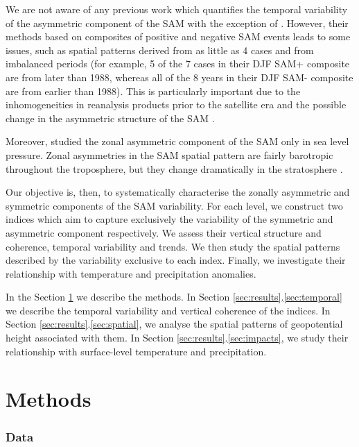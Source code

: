 \documentclass[]{ametsocV5}
\begin{document}
We are not aware of any previous work which quantifies the temporal
variability of the asymmetric component of the SAM with the exception of
\citet{fogt2012}. However, their methods based on composites of positive
and negative SAM events leads to some issues, such as spatial patterns
derived from as little as 4 cases and from imbalanced periods (for
example, 5 of the 7 cases in their DJF SAM+ composite are from later
than 1988, whereas all of the 8 years in their DJF SAM- composite are
from earlier than 1988). This is particularly important due to the
inhomogeneities in reanalysis products prior to the satellite era and
the possible change in the asymmetric structure of the SAM
\citep{silvestri2009}.

Moreover, \citet{fogt2012} studied the zonal asymmetric component of the
SAM only in sea level pressure. Zonal asymmetries in the SAM spatial
pattern are fairly barotropic throughout the troposphere, but they
change dramatically in the stratosphere \citep{baldwin2009}.

Our objective is, then, to systematically characterise the zonally
asymmetric and symmetric components of the SAM variability. For each
level, we construct two indices which aim to capture exclusively the
variability of the symmetric and asymmetric component respectively. We
assess their vertical structure and coherence, temporal variability and
trends. We then study the spatial patterns described by the variability
exclusive to each index. Finally, we investigate their relationship with
temperature and precipitation anomalies.

In the Section \ref{sec:methods} we describe the methods. In Section
\ref{sec:results}.\ref{sec:temporal} we describe the temporal
variability and vertical coherence of the indices. In Section
\ref{sec:results}.\ref{sec:spatial}, we analyse the spatial patterns of
geopotential height associated with them. In Section
\ref{sec:results}.\ref{sec:impacts}, we study their relationship with
surface-level temperature and precipitation.

\section{Methods}

\label{sec:methods}

\subsubsection{Data}
\end{document}
